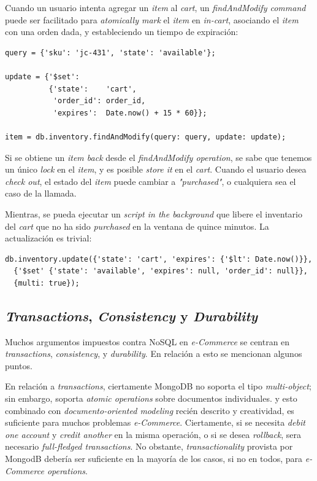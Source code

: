 Cuando un usuario intenta agregar un \textit{item} al \textit{cart}, un \textit{findAndModify command} puede ser facilitado para \textit{atomically mark} el \textit{item} en \textit{in-cart}, asociando el \textit{item} con una orden dada, y estableciendo un tiempo de expiración:

\begin{lstlisting}[caption= Ejemplo de \textit{atomic operation}.]
	query = {'sku': 'jc-431', 'state': 'available'};

update = {'$set':
          {'state':    'cart',
           'order_id': order_id,
           'expires':  Date.now() + 15 * 60}};

item = db.inventory.findAndModify(query: query, update: update);
\end{lstlisting}

Si se obtiene un \textit{item back} desde el \textit{findAndModify operation}, se sabe que tenemos un único \textit{lock} en el \textit{item}, y es posible \textit{store it} en el \textit{cart}. Cuando el usuario desea \textit{check out}, el estado del \textit{item} puede cambiar a \textit{"purchased"}, o cualquiera sea el caso de la llamada.

Mientras, se pueda ejecutar un \textit{script in the background} que libere el inventario del \textit{cart} que no ha sido \textit{purchased} en la ventana de quince minutos. La actualización es trivial:

\begin{lstlisting}[caption= Ejemplo de \textit{atomic operation}.]
	db.inventory.update({'state': 'cart', 'expires': {'$lt': Date.now()}},
  {'$set' {'state': 'available', 'expires': null, 'order_id': null}},
  {multi: true});
\end{lstlisting} 

\subsection{\textit{Transactions}, \textit{Consistency} y \textit{Durability}}

Muchos argumentos impuestos contra NoSQL en \textit{e-Commerce} se centran en \textit{transactions}, \textit{consistency}, y \textit{durability}. En relación a esto se mencionan algunos puntos.

En relación a \textit{transactions}, ciertamente MongoDB no soporta el tipo \textit{multi-object}; sin embargo, soporta \textit{atomic operations} sobre documentos individuales. y esto combinado con \textit{documento-oriented modeling} recién descrito y creatividad, es suficiente para muchos problemas \textit{e-Commerce}. Ciertamente, si se necesita \textit{debit one account} y \textit{credit another} en la misma operación, o si se desea \textit{rollback}, sera necesario \textit{full-fledged transactions}. No obstante, \textit{transactionality} provista por MongodB debería ser suficiente en la mayoría de los casos, si no en todos, para \textit{e-Commerce operations}.

